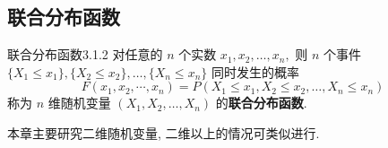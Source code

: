   \subsection{联合分布函数}\label{ssec:3.1.2}
  \begin{definition}{联合分布函数}{3.1.2}
  	对任意的 $n$ 个实数 $x_1,x_2,\ldots,x_n ,$ 则 $n$ 个事件 $\{X_1\leq x_1\},\{X_2 \leq x_2\},\ldots,\{X_n\leq x_n\}$ 同时发生的概率
    \begin{equation}
    	F\left(x_{1}, x_{2}, \cdots, x_{n}\right)=P\left(X_{1} \leq x_{1}, X_{2} \leq x_{2}, \ldots, X_{n} \leq x_{n}\right)\label{eq:3.1.1}
    \end{equation}
	称为 $n$ 维随机变量 $(X_1,X_2,\ldots,X_n)$ 的\textbf{联合分布函数}. 
  \end{definition}
   本章主要研究二维随机变量, 二维以上的情况可类似进行. 

